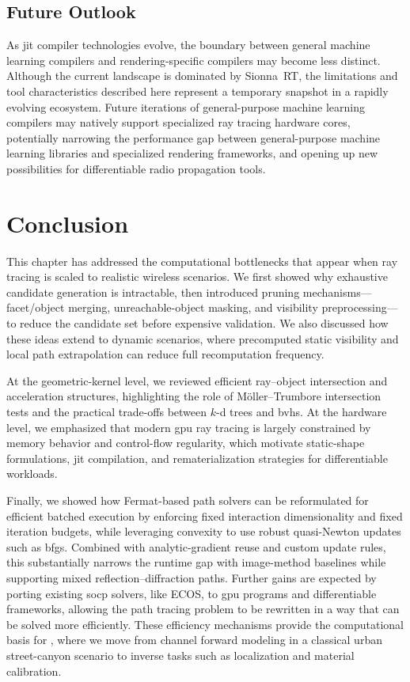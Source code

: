 \subsection{Future Outlook}

As \gls{jit} compiler technologies evolve, the boundary between general machine learning compilers and rendering-specific compilers may become less distinct. Although the current landscape is dominated by Sionna~RT, the limitations and tool characteristics described here represent a temporary snapshot in a rapidly evolving ecosystem. Future iterations of general-purpose machine learning compilers may natively support specialized ray tracing hardware cores, potentially narrowing the performance gap between general-purpose machine learning libraries and specialized rendering frameworks, and opening up new possibilities for differentiable radio propagation tools.

\section{Conclusion}

This chapter has addressed the computational bottlenecks that appear when ray tracing is scaled to realistic wireless scenarios. We first showed why exhaustive candidate generation is intractable, then introduced pruning mechanisms---facet/object merging, unreachable-object masking, and visibility preprocessing---to reduce the candidate set before expensive validation. We also discussed how these ideas extend to dynamic scenarios, where precomputed static visibility and local path extrapolation can reduce full recomputation frequency.

At the geometric-kernel level, we reviewed efficient ray--object intersection and acceleration structures, highlighting the role of Möller--Trumbore intersection tests and the practical trade-offs between $k$-d trees and \glspl{bvh}. At the hardware level, we emphasized that modern \gls{gpu} ray tracing is largely constrained by memory behavior and control-flow regularity, which motivate static-shape formulations, \gls{jit} compilation, and rematerialization strategies for differentiable workloads.

Finally, we showed how Fermat-based path solvers can be reformulated for efficient batched execution by enforcing fixed interaction dimensionality and fixed iteration budgets, while leveraging convexity to use robust quasi-Newton updates such as \gls{bfgs}. Combined with analytic-gradient reuse and custom update rules, this substantially narrows the runtime gap with image-method baselines while supporting mixed reflection--diffraction paths. Further gains are expected by porting existing \gls{socp} solvers, like ECOS, to \gls{gpu} programs and differentiable frameworks, allowing the path tracing problem to be rewritten in a way that can be solved more efficiently. These efficiency mechanisms provide the computational basis for , where we move from channel forward modeling in a classical urban street-canyon scenario to inverse tasks such as localization and material calibration.
